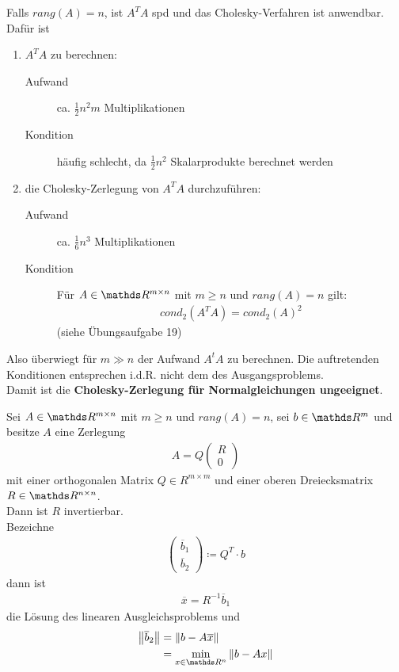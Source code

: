 Falls $rang(A) = n$, ist $A^TA$ spd und das Cholesky-Verfahren ist anwendbar. \\
Dafür ist
\begin{enumerate}[1.]
\item $A^TA$ zu berechnen:
  \begin{description}
  \item[Aufwand] ca. $\frac{1}{2}n^2m$ Multiplikationen 
  \item[Kondition] häufig schlecht, da $\frac{1}{2}n^2$ Skalarprodukte berechnet werden
  \end{description}
\item die Cholesky-Zerlegung von $A^TA $ durchzuführen:
  \begin{description}
  \item[Aufwand] ca. $\frac{1}{6}n^3$ Multiplikationen 
  \item[Kondition] Für $A\in\R^{m\times n}$ mit $m\geq n$ und $rang(A)=n$ gilt:
    \begin{gather}
      cond_2(A^TA) = cond_2(A)^2 \label{IV.3.7}
    \end{gather}
    (siehe Übungsaufgabe 19)
  \end{description}
\end{enumerate}
Also überwiegt für $m\gg n$ der Aufwand $A^tA$ zu berechnen.
Die auftretenden Konditionen entsprechen i.d.R. nicht dem des Ausgangsproblems.\\
Damit ist die 
\textbf{Cholesky-Zerlegung  für Normalgleichungen ungeeignet}.


\begin{Satze}
  Sei $A\in \R^{m\times n} $ mit $m\geq n$ und $rang(A) = n$,
  sei $b\in\R^m$ und besitze $A$ eine Zerlegung
  \begin{gather*}
    A= Q\begin{pmatrix}R\\0\end{pmatrix}
  \end{gather*}
  mit einer orthogonalen Matrix $Q\in R^{m\times m}$ und 
  einer oberen Dreiecksmatrix $R\in \R^{n\times n}$. \\
  Dann ist $R$ invertierbar. \\
  Bezeichne 
  \begin{gather}
    \begin{pmatrix} \overline{b}_1 \\ \overline{b}_2\end{pmatrix}
    \coloneqq Q^T\cdot b
    \label{IV.3.9}
  \end{gather}
  dann ist
  \begin{gather}
    \overline{x} = R^{-1} \overline{b}_1 
    \label{IV.3.10}
  \end{gather}
  die Lösung des linearen Ausgleichsproblems und
  \begin{align*}
    \nn{\overline{b}_2} &= \nn{b-A\overline{x}} \\
                        & = \min_{x\in \Ren }\nn{b-Ax}
  \end{align*}
\end{Satze}

